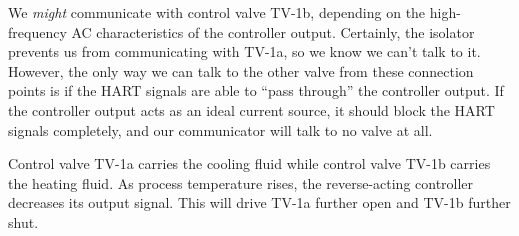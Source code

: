 \vskip 10pt

We {\it might} communicate with control valve TV-1b, depending on the high-frequency AC characteristics of the controller output.  Certainly, the isolator prevents us from communicating with TV-1a, so we know we can't talk to it.  However, the only way we can talk to the other valve from these connection points is if the HART signals are able to ``pass through'' the controller output.  If the controller output acts as an ideal current source, it should block the HART signals completely, and our communicator will talk to no valve at all.

\vskip 10pt

Control valve TV-1a carries the cooling fluid while control valve TV-1b carries the heating fluid.  As process temperature rises, the reverse-acting controller decreases its output signal.  This will drive TV-1a further open and TV-1b further shut.











